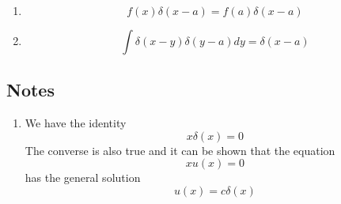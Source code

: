 \begin{enumerate}[label=\textbf{Property \ \arabic*},start=1]
				\item
				\begin{equation}
					f(x) \delta(x-a) = f(a) \delta(x-a)
				\end{equation}

				\item
				\begin{equation}
					\int \delta(x-y) \delta(y-a) dy = \delta(x-a)
				\end{equation}
				
			
		\end{enumerate}
		
		\subsection{Notes}
		\begin{enumerate}[label=\textbf{Note : \ \arabic*},start=1]
			\item 
			We have the identity
			\begin{equation}
				x\delta(x) = 0
			\end{equation}
			The converse is also true and it can be shown that the equation
			\begin{equation}
				x u(x) = 0
			\end{equation}
			has the general solution
			\begin{equation}
				u(x) = c \delta(x)
			\end{equation}
			

\end{enumerate}
